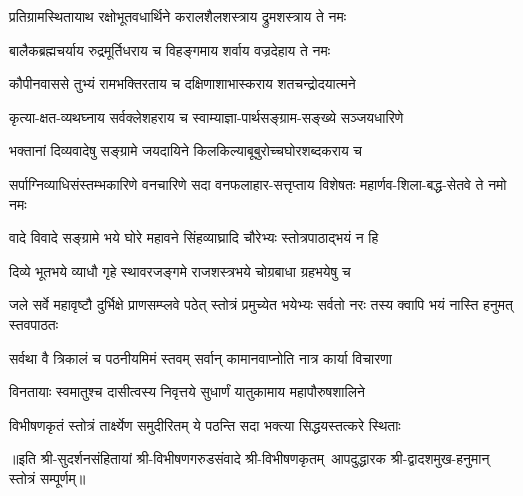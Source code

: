 \twolineshloka
{प्रतिग्रामस्थितायाथ रक्षोभूतवधार्थिने}
{करालशैलशस्त्राय द्रुमशस्त्राय ते नमः}

\twolineshloka
{बालैकब्रह्मचर्याय रुद्रमूर्तिधराय च}
{विहङ्गमाय शर्वाय वज्रदेहाय ते नमः}

\twolineshloka
{कौपीनवाससे तुभ्यं रामभक्तिरताय च}
{दक्षिणाशाभास्कराय शतचन्द्रोदयात्मने}

\twolineshloka
{कृत्या-क्षत-व्यथघ्नाय सर्वक्लेशहराय च}
{स्वाम्याज्ञा-पार्थसङ्ग्राम-सङ्ख्ये सञ्जयधारिणे}

\twolineshloka
{भक्तानां दिव्यवादेषु सङ्ग्रामे जयदायिने}
{किलकिल्याबूबुरोच्चघोरशब्दकराय च}

\threelineshloka
{सर्पाग्निव्याधिसंस्तम्भकारिणे वनचारिणे}
{सदा वनफलाहार-सत्तृप्ताय विशेषतः}
{महार्णव-शिला-बद्ध-सेतवे ते नमो नमः}

\twolineshloka
{वादे विवादे सङ्ग्रामे भये घोरे महावने}
{सिंहव्याघ्रादि चौरेभ्यः स्तोत्रपाठाद्भयं न हि}

\twolineshloka
{दिव्ये भूतभये व्याधौ गृहे स्थावरजङ्गमे}
{राजशस्त्रभये चोग्रबाधा ग्रहभयेषु च}

\threelineshloka
{जले सर्वे महावृष्टौ दुर्भिक्षे प्राणसम्प्लवे}
{पठेत् स्तोत्रं प्रमुच्येत भयेभ्यः सर्वतो नरः}
{तस्य क्वापि भयं नास्ति हनुमत् स्तवपाठतः}

\twolineshloka
{सर्वथा वै त्रिकालं च पठनीयमिमं स्तवम्}
{सर्वान् कामानवाप्नोति नात्र कार्या विचारणा}

\twolineshloka
{विनतायाः स्वमातुश्च दासीत्वस्य निवृत्तये}
{सुधार्णं यातुकामाय महापौरुषशालिने}

\twolineshloka
{विभीषणकृतं स्तोत्रं तार्क्ष्येण समुदीरितम्}
{ये पठन्ति सदा भक्त्या सिद्धयस्तत्करे स्थिताः}

॥इति श्री-सुदर्शनसंहितायां श्री-विभीषणगरुडसंवादे श्री-विभीषणकृतम्~आपदुद्धारक श्री-द्वादशमुख-हनुमान् स्तोत्रं सम्पूर्णम्॥
